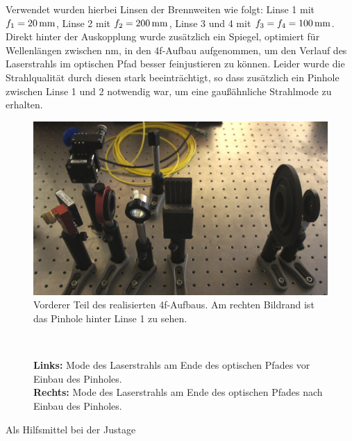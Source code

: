 Verwendet wurden hierbei Linsen der Brennweiten wie folgt: Linse 1 mit $f_{1}=\unit[20]{mm}$, Linse 2 mit $f_{2}=\unit[200]{mm}$, Linse 3 und 4 mit $f_{3}=f_{4}=\unit[100]{mm}$. Direkt hinter der Auskopplung wurde zusätzlich ein Spiegel, optimiert für Wellenlängen zwischen \unit[400-700]{nm}, in den 4f-Aufbau aufgenommen, um den Verlauf des Laserstrahls im optischen Pfad besser feinjustieren zu können. Leider wurde die Strahlqualität durch diesen stark beeinträchtigt, so dass zusätzlich ein Pinhole zwischen Linse 1 und 2 notwendig war, um eine gaußähnliche Strahlmode zu erhalten.\\


\begin{figure}[h]
	\centering
	\includegraphics[width=0.7\linewidth]{images/4f-anfang.JPG}
	\caption[Vorderer Teil des 4f-Aufbaus]{
		Vorderer Teil des realisierten 4f-Aufbaus. Am rechten Bildrand ist das Pinhole hinter Linse 1 zu sehen.
	}
	\label{fig:_DSC7961}
\end{figure}

\begin{figure}[ht]
	\centering
	~
	\caption{
		\textbf{Links:} Mode des Laserstrahls am Ende des optischen Pfades vor Einbau des Pinholes.\\
		\textbf{Rechts:} Mode des Laserstrahls am Ende des optischen Pfades nach Einbau des Pinholes.
	}
	\label{fig:_DSC7988}
\end{figure}


Als Hilfsmittel bei der Justage 


